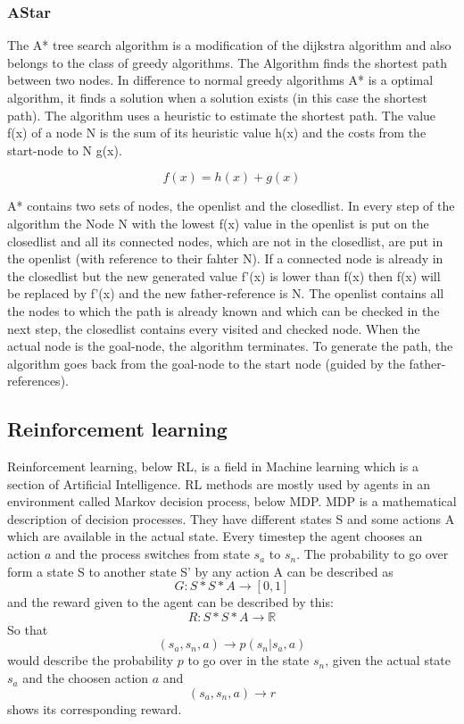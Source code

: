 \subsubsection{AStar}

The A* tree search algorithm is a modification of the dijkstra algorithm and also belongs to the class of greedy algorithms. The Algorithm finds the shortest path between two nodes. In difference to normal greedy algorithms A* is a optimal algorithm, it finds a solution when a solution exists (in this case the shortest path). The algorithm uses a heuristic to estimate the shortest path. The value f(x) of a node N is the sum of its heuristic value h(x) and the costs from the start-node to N g(x).

\begin{equation}
f(x)=h(x)+g(x)
\end{equation}


A* contains two sets of nodes, the openlist and the closedlist. In every step of the algorithm the Node N with the lowest f(x) value in the openlist is put on the closedlist and all its connected nodes, which are not in the closedlist, are put in the openlist (with reference to their fahter N). If a connected node is already in the closedlist but the new generated value f'(x) is lower than f(x) then f(x) will be replaced by f'(x) and the new father-reference is N. The openlist contains all the nodes to which the path is already known and which can be checked in the next step, the closedlist contains every visited and checked node. When the actual node is the goal-node, the algorithm terminates. To generate the path, the algorithm goes back from the goal-node to the start node (guided by the father-references). 

\subsection{Reinforcement learning} 
 
Reinforcement learning, below RL, is a field in Machine learning which is a section of Artificial Intelligence. RL methods are mostly used by agents in an environment called Markov decision process, below MDP. MDP is a mathematical description of decision processes. They have different states S and some actions A which are available in the actual state. Every timestep the agent chooses an action $a$ and the process switches from state $s_a$ to $s_n$. The probability to go over form a state S to another state S' by any action A can be described as
\[
	G: S*S*A \rightarrow [0,1] 
\] 
and the reward given to the agent can be described by this:
\[
	R: S*S*A \rightarrow \mathbb{R}
\]
So that
\[
	(s_a, s_n, a) \rightarrow p(s_n|s_a, a)
\]
would describe the probability $p$ to go over in the state $s_n$, given the actual state $s_a$ and the choosen action $a$ and 
\[
	(s_a, s_n, a) \rightarrow r
\]
shows its corresponding reward.  



